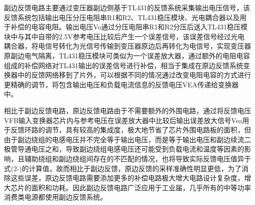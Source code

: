 副边反馈电路主要通过变压器副边侧基于TL431的反馈系统采集输出电压信号，该反馈系统包括输出电压分压电阻串R1和R2、TL431稳压模块、光电耦合器以及用于补偿的电容电阻。输出电压Vo通过分压电阻串R1和R2分压后送入TL431稳压模块中与其中自带的2.5V参考电压比较后产生一个误差信号，该误差信号经过光电耦合器，将电信号转化为光信号传输到变压器原边后再转化为电信号，实现变压器原副边电气隔离，TL431稳压模块可类似为一个误差放大器，通过额外的电阻电容组成的补偿网络对TL431输出的误差信号进行补偿，相当于集成在原边反馈系统变换器中的反馈网络移到了片外，可以根据不同的情况通过改变电阻电容的方式进行更精确的调节，将包含输出电压和负载电流信息的反馈电压VEA传递给变换器中。

相比于副边反馈电路，原边反馈电路由于不需要额外的外围电路，通过将反馈电压VFB输入变换器芯片内与参考电压在误差放大器中比较后输出误差放大信号Vea用于反馈环路的调节，具有较高的集成度，极大地节省了芯片外围电路板的面积，但由于副边绕组的电感电压并不完全等于输出电压，而是等于输出电压和副边续流二极管导通电压之和，导致副边绕组电感电压还可能受到负载电流和温度等因素的影响，且辅助绕组和副边绕组间存在的不匹配的情况，也将导致实际反馈电压值异于式(2-)的计算值，故而相比于副边反馈，原边反馈的采样准确性明显更低，为了消除这些误差，原边反馈电路需要添加更多的补偿电路极大增大电路设计复杂度，增大芯片的面积和功耗。因此副边反馈电路广泛应用于工业届，几乎所有的中等功率消费类电源都使用副边反馈系统。



 






















